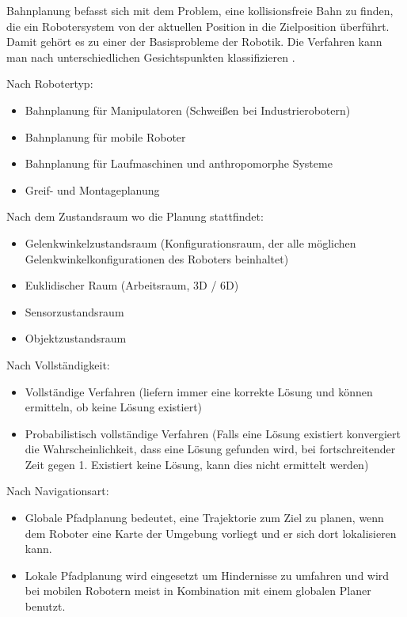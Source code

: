 Bahnplanung befasst sich mit dem Problem, eine kollisionsfreie Bahn zu finden, die ein Robotersystem von der aktuellen Position in die Zielposition überführt.
Damit gehört es zu einer der Basisprobleme der Robotik.
Die Verfahren kann man nach unterschiedlichen Gesichtspunkten klassifizieren \cite{rob1}.

Nach Robotertyp:
\begin{itemize}
\item Bahnplanung für Manipulatoren (\zB Schweißen bei Industrierobotern)
\item Bahnplanung für mobile Roboter
\item Bahnplanung für Laufmaschinen und anthropomorphe Systeme
\item Greif- und Montageplanung
\end{itemize}

Nach dem Zustandsraum wo die Planung stattfindet:
\begin{itemize}
\item Gelenkwinkelzustandsraum (Konfigurationsraum, der alle möglichen Gelenkwinkelkonfigurationen des Roboters beinhaltet)
\item Euklidischer Raum (Arbeitsraum, 3D / 6D)
\item Sensorzustandsraum
\item Objektzustandsraum
\end{itemize}

Nach Vollständigkeit:
\begin{itemize}
\item Vollständige Verfahren (liefern immer eine korrekte Lösung und können ermitteln, ob keine Lösung existiert)
\item Probabilistisch vollständige Verfahren (Falls eine Lösung existiert konvergiert die Wahrscheinlichkeit, dass eine Lösung gefunden wird, bei fortschreitender Zeit gegen 1. Existiert keine Lösung, kann dies nicht ermittelt werden)
\end{itemize}

Nach Navigationsart:
\begin{itemize}
\item Globale Pfadplanung bedeutet, eine Trajektorie zum Ziel zu planen, wenn dem Roboter eine Karte der Umgebung vorliegt und er sich dort lokalisieren kann.
\item Lokale Pfadplanung wird eingesetzt um Hindernisse zu umfahren und wird bei mobilen Robotern meist in Kombination mit einem globalen Planer benutzt. 
\end{itemize}

